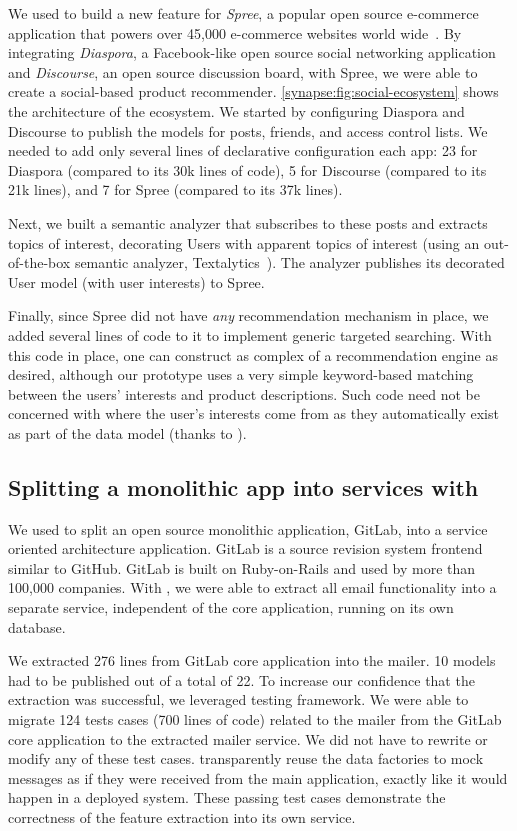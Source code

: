 We used \synapse to build a new feature for \emph{Spree}, a popular open source
e-commerce application that powers over 45,000 e-commerce websites world wide~\cite{spree-site}.
By integrating \emph{Diaspora}, a Facebook-like open source social networking
application and \emph{Discourse}, an open source discussion board, with Spree, we
were able to create a social-based product recommender.
\F\ref{synapse:fig:social-ecosystem} shows the architecture of the ecosystem.
We started by configuring Diaspora and Discourse to publish the models
for posts, friends, and access control lists.
We needed to add only several lines of declarative configuration each app: 23
for Diaspora (compared to its 30k lines of code), 5 for Discourse (compared to
its 21k lines), and 7 for Spree (compared to its 37k lines).

Next, we built a semantic analyzer that subscribes to these posts and extracts topics of interest, decorating Users with apparent topics of interest (using an out-of-the-box semantic analyzer, Textalytics~\cite{textalytics}).
The analyzer publishes its decorated {\code User} model (with user interests) to Spree.

Finally, since Spree did not have \emph{any} recommendation mechanism in place, we added several lines of code to it to implement generic targeted searching.
With this code in place, one can construct as complex of a recommendation engine as
desired, although our prototype uses a very simple keyword-based matching
between the users' interests and product descriptions. Such code need not be
concerned with where the user's interests come from as they
automatically exist as part of the data model (thanks to \synapse).

\subsection{Splitting a monolithic app into services with \synapse}
\label{synapse:sec:apps:gitlab}

We used \synapse to split an open source monolithic application, GitLab, into a
service oriented architecture application. GitLab is a source revision system
frontend similar to GitHub.  GitLab is built on Ruby-on-Rails and used by more
than 100,000 companies.  With \synapse, we were able to extract all email
functionality into a separate service, independent of the core application,
running on its own database.

We extracted 276 lines from GitLab core application into the mailer.  10 models
had to be published out of a total of 22.  To increase our confidence that the
extraction was successful, we leveraged \synapse testing framework. We were able
to migrate 124 tests cases (700 lines of code) related to the mailer from the
GitLab core application to the extracted mailer service.  We did not have to
rewrite or modify any of these test cases.  \synapse transparently reuse the
data factories to mock \synapse messages as if they were received from the main
application, exactly like it would happen in a deployed system. These passing
test cases demonstrate the correctness of the feature extraction into its own
service.

